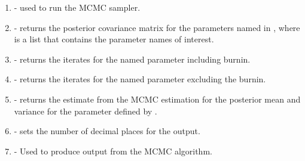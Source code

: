 \documentclass[article]{jss}
\begin{document}
\begin{enumerate}
\item {} - used to run the MCMC sampler. 
\item {} - returns the posterior
  covariance matrix for the parameters named in , where
   is a list that contains the parameter names of
  interest.
\item {} - returns the iterates for the named parameter
  including burnin.
\item {} - returns the iterates for the named
  parameter excluding the burnin.
\item {} - returns the estimate from the MCMC estimation
  for the posterior mean and variance for the parameter defined by . 
\item {} - sets the number of decimal places for
  the output. 
\item {} - Used to produce output from the MCMC algorithm.
  

\end{enumerate}
\end{document}
